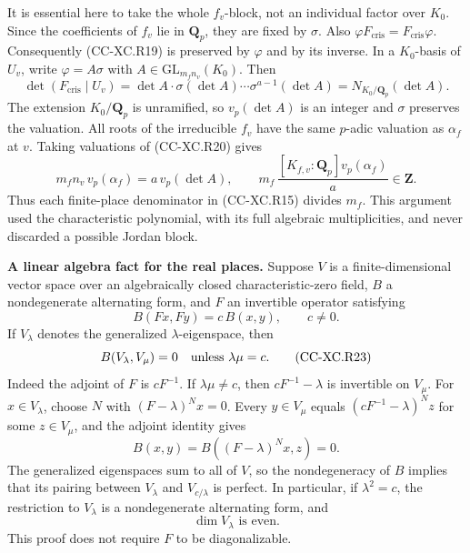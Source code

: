 It is essential here to take the whole \(f_v\)-block, not an individual
factor over \(K_0\). Since the coefficients of \(f_v\) lie in
\(\mathbf Q_p\), they are fixed by \(\sigma\). Also
\(\varphi F_{\mathrm{cris}}=F_{\mathrm{cris}}\varphi\). Consequently
(CC-XC.R19) is preserved by \(\varphi\) and by its inverse. In a
\(K_0\)-basis of \(U_v\), write \(\varphi=A\sigma\) with
\(A\in\mathrm{GL}_{m_fn_v}(K_0)\). Then \[
 \det(F_{\mathrm{cris}}\mid U_v)
   =\det A\cdot\sigma(\det A)\cdots\sigma^{a-1}(\det A)
   =N_{K_0/\mathbf Q_p}(\det A).
                                                        \tag{CC-XC.R20}
\] The extension \(K_0/\mathbf Q_p\) is unramified, so \(v_p(\det A)\)
is an integer and \(\sigma\) preserves the valuation. All roots of the
irreducible \(f_v\) have the same \(p\)-adic valuation as \(\alpha_f\)
at \(v\). Taking valuations of (CC-XC.R20) gives \[
 m_f n_v\,v_p(\alpha_f)=a\,v_p(\det A),\qquad
 m_f\,\frac{[K_{f,v}:\mathbf Q_p]v_p(\alpha_f)}a
        \in\mathbf Z.                                 \tag{CC-XC.R21}
\] Thus each finite-place denominator in (CC-XC.R15) divides \(m_f\).
This argument used the characteristic polynomial, with its full
algebraic multiplicities, and never discarded a possible Jordan block.

\textbf{A linear algebra fact for the real places.} Suppose \(V\) is a
finite-dimensional vector space over an algebraically closed
characteristic-zero field, \(B\) a nondegenerate alternating form, and
\(F\) an invertible operator satisfying \[
 B(Fx,Fy)=c\,B(x,y),\qquad c\ne0.
                                                        \tag{CC-XC.R22}
\] If \(V_\lambda\) denotes the generalized \(\lambda\)-eigenspace, then
\[
 B(V_\lambda,V_\mu)=0\quad\hbox{unless }\lambda\mu=c.
                                                        \tag{CC-XC.R23}
\] Indeed the adjoint of \(F\) is \(cF^{-1}\). If \(\lambda\mu\ne c\),
then \(cF^{-1}-\lambda\) is invertible on \(V_\mu\). For
\(x\in V_\lambda\), choose \(N\) with \((F-\lambda)^N x=0\). Every
\(y\in V_\mu\) equals \((cF^{-1}-\lambda)^N z\) for some \(z\in V_\mu\),
and the adjoint identity gives \[
 B(x,y)=B((F-\lambda)^N x,z)=0.
 \] The generalized eigenspaces sum to all of \(V\), so the
nondegeneracy of \(B\) implies that its pairing between \(V_\lambda\)
and \(V_{c/\lambda}\) is perfect. In particular, if \(\lambda^2=c\), the
restriction to \(V_\lambda\) is a nondegenerate alternating form, and \[
                         \dim V_\lambda\text{ is even}. \tag{CC-XC.R24}
\] This proof does not require \(F\) to be diagonalizable.


